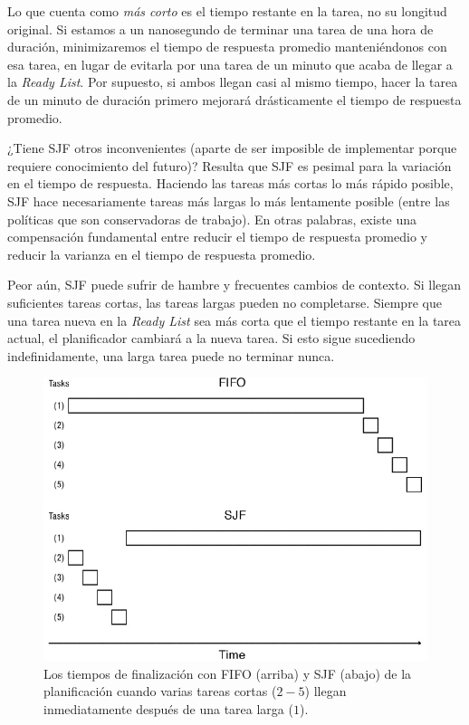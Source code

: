 \documentclass[10pt]{book}
\begin{document}
Lo que cuenta como \textit{más corto} es el tiempo restante en la tarea, no su longitud original. Si estamos a un nanosegundo de terminar una tarea de una hora de duración, minimizaremos el tiempo de respuesta promedio manteniéndonos con esa tarea, en lugar de evitarla por una tarea de un minuto que acaba de llegar a la \textit{Ready List}. Por supuesto, si ambos llegan casi al mismo tiempo, hacer la tarea de un minuto de duración primero mejorará drásticamente el tiempo de respuesta promedio.

¿Tiene SJF otros inconvenientes (aparte de ser imposible de implementar porque requiere conocimiento del futuro)? Resulta que SJF es pesimal para la variación en el tiempo de respuesta. Haciendo las tareas más cortas lo más rápido posible, SJF hace necesariamente tareas más largas lo más lentamente posible (entre las políticas que son conservadoras de trabajo). En otras palabras, existe una compensación fundamental entre reducir el tiempo de respuesta promedio y reducir la varianza en el tiempo de respuesta promedio.

Peor aún, SJF puede sufrir de hambre y frecuentes cambios de contexto. Si llegan suficientes tareas cortas, las tareas largas pueden no completarse. Siempre que una tarea nueva en la \textit{Ready List} sea más corta que el tiempo restante en la tarea actual, el planificador cambiará a la nueva tarea. Si esto sigue sucediendo indefinidamente, una larga tarea puede no terminar nunca.

\begin{figure}[tbhp]
\centerline{\includegraphics[scale=0.70]{img/fig0701}}
\caption{Los tiempos de finalización con FIFO (arriba) y SJF (abajo) de la planificación cuando varias tareas cortas ($2-5$) llegan inmediatamente después de una tarea larga ($1$).}
\label{fig0701}
\end{figure}
\end{document}
